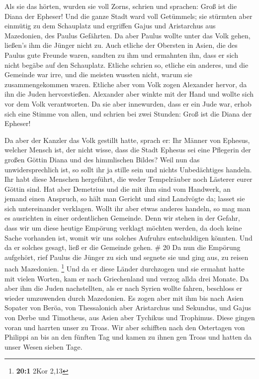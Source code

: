 Als sie das hörten, wurden sie voll Zorns, schrien und
sprachen: Groß ist die Diana der Epheser!  Und die ganze
Stadt ward voll Getümmels; sie stürmten aber einmütig zu dem Schauplatz
und ergriffen Gajus und Aristarchus aus Mazedonien, des Paulus
Gefährten.  Da aber Paulus wollte unter das Volk gehen,
ließen's ihm die Jünger nicht zu.  Auch etliche der
Obersten in Asien, die des Paulus gute Freunde waren, sandten zu ihm und
ermahnten ihn, dass er sich nicht begäbe auf den Schauplatz.
 Etliche schrien so, etliche ein anderes, und die Gemeinde
war irre, und die meisten wussten nicht, warum sie zusammengekommen
waren.  Etliche aber vom Volk zogen Alexander hervor, da
ihn die Juden hervorstießen. Alexander aber winkte mit der Hand und
wollte sich vor dem Volk verantworten.  Da sie aber
innewurden, dass er ein Jude war, erhob sich eine Stimme von allen, und
schrien bei zwei Stunden: Groß ist die Diana der Epheser!

 Da aber der Kanzler das Volk gestillt hatte, sprach er:
Ihr Männer von Ephesus, welcher Mensch ist, der nicht wisse, dass die
Stadt Ephesus sei eine Pflegerin der großen Göttin Diana und des
himmlischen Bildes?  Weil nun das unwidersprechlich ist, so
sollt ihr ja stille sein und nichts Unbedächtiges handeln. 
Ihr habt diese Menschen hergeführt, die weder Tempelräuber noch Lästerer
eurer Göttin sind.  Hat aber Demetrius und die mit ihm sind
vom Handwerk, an jemand einen Anspruch, so hält man Gericht und sind
Landvögte da; lasset sie sich untereinander verklagen. 
Wollt ihr aber etwas anderes handeln, so mag man es ausrichten in einer
ordentlichen Gemeinde.  Denn wir stehen in der Gefahr, dass
wir um diese heutige Empörung verklagt möchten werden, da doch keine
Sache vorhanden ist, womit wir uns solches Aufruhrs entschuldigen
könnten. Und da er solches gesagt, ließ er die Gemeinde gehen. \# 20
 Da nun die Empörung aufgehört, rief Paulus die Jünger zu
sich und segnete sie und ging aus, zu reisen nach Mazedonien.
\footnote{\textbf{20:1} 2Kor 2,13}  Und da er diese Länder
durchzogen und sie ermahnt hatte mit vielen Worten, kam er nach
Griechenland und verzog allda drei Monate.  Da aber ihm die
Juden nachstellten, als er nach Syrien wollte fahren, beschloss er
wieder umzuwenden durch Mazedonien.  Es zogen aber mit ihm
bis nach Asien Sopater von Beröa, von Thessalonich aber Aristarchus und
Sekundus, und Gajus von Derbe und Timotheus, aus Asien aber Tychikus und
Trophimus.  Diese gingen voran und harrten unser zu Troas.
 Wir aber schifften nach den Ostertagen von Philippi an bis
an den fünften Tag und kamen zu ihnen gen Troas und hatten da unser
Wesen sieben Tage.

